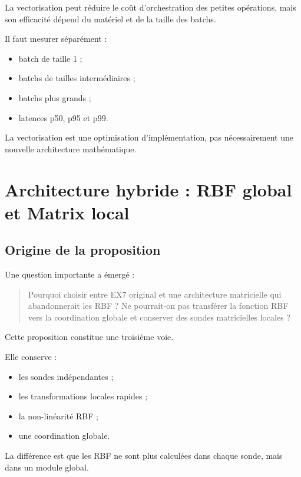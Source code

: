\documentclass[11pt,a4paper]{report}
\begin{document}
La vectorisation peut réduire le coût d'orchestration
des petites opérations, mais son efficacité dépend
du matériel et de la taille des batchs.

Il faut mesurer séparément :

\begin{itemize}
  \item batch de taille 1 ;
  \item batchs de tailles intermédiaires ;
  \item batchs plus grands ;
  \item latences p50, p95 et p99.
\end{itemize}

La vectorisation est une optimisation d'implémentation,
pas nécessairement une nouvelle architecture mathématique.

\chapter{Architecture hybride : RBF global et Matrix local}

\section{Origine de la proposition}

Une question importante a émergé :

\begin{quote}
Pourquoi choisir entre EX7 original et une architecture
matricielle qui abandonnerait les RBF ?
Ne pourrait-on pas transférer la fonction RBF vers la
coordination globale et conserver des sondes matricielles
locales ?
\end{quote}

Cette proposition constitue une troisième voie.

Elle conserve :
\begin{itemize}
  \item les sondes indépendantes ;
  \item les transformations locales rapides ;
  \item la non-linéarité RBF ;
  \item une coordination globale.
\end{itemize}

La différence est que les RBF ne sont plus calculées
dans chaque sonde, mais dans un module global.
\end{document}
